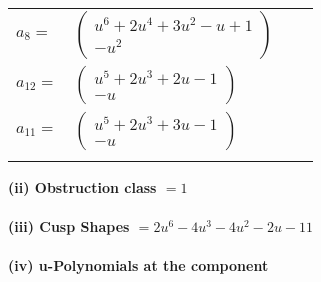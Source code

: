 \documentclass[1p]{elsarticle_modified}
\theoremstyle{definition}
\begin{document}
\begin{tabular}{m{7pt} m{180pt} m{7pt} m{180pt} }
\flushright $a_{8}=$&$\begin{pmatrix}u^6+2 u^4+3 u^2- u+1\\- u^2\end{pmatrix}$ \\
\flushright $a_{12}=$&$\begin{pmatrix}u^5+2 u^3+2 u-1\\- u\end{pmatrix}$ \\
\flushright $a_{11}=$&$\begin{pmatrix}u^5+2 u^3+3 u-1\\- u\end{pmatrix}$\\&\end{tabular}
\flushleft \textbf{(ii) Obstruction class $= 1$}\\~\\
\flushleft \textbf{(iii) Cusp Shapes $= 2 u^6-4 u^3-4 u^2-2 u-11$}\\~\\
\newpage\renewcommand{\arraystretch}{1}
\flushleft \textbf{(iv) u-Polynomials at the component}\newline \\
\end{document}
